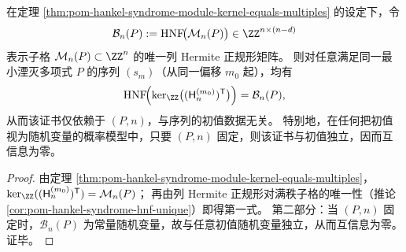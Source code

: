 \begin{corollary}\label{cor:pom-hankel-syndrome-hnf-model-free}
在定理 \ref{thm:pom-hankel-syndrome-module-kernel-equals-multiples} 的设定下，令
\[
\mathcal B_{n}(P):=\mathrm{HNF}\!\bigl(\mathcal M_n(P)\bigr)\in\ZZ^{n\times(n-d)}
\]
表示子格 \(\mathcal M_n(P)\subset\ZZ^n\) 的唯一列 Hermite 正规形矩阵。
则对任意满足同一最小湮灭多项式 \(P\) 的序列 \((s_m)\)（从同一偏移 \(m_0\) 起），均有
\[
\mathrm{HNF}\!\Bigl(\ker_{\ZZ}\bigl((\mathsf H^{(m_0)}_{n})^{\mathsf T}\bigr)\Bigr)=\mathcal B_n(P),
\]
从而该证书仅依赖于 \((P,n)\)，与序列的初值数据无关。
特别地，在任何把初值视为随机变量的概率模型中，只要 \((P,n)\) 固定，则该证书与初值独立，因而互信息为零。
\end{corollary}
\begin{proof}
由定理 \ref{thm:pom-hankel-syndrome-module-kernel-equals-multiples}，
\(
\ker_{\ZZ}((\mathsf H^{(m_0)}_{n})^{\mathsf T})=\mathcal M_n(P)
\)；
再由列 Hermite 正规形对满秩子格的唯一性（推论 \ref{cor:pom-hankel-syndrome-hnf-unique}）即得第一式。
第二部分：当 \((P,n)\) 固定时，\(\mathcal B_n(P)\) 为常量随机变量，故与任意初值随机变量独立，从而互信息为零。证毕。
\end{proof}

